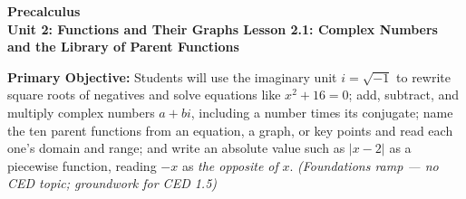\documentclass[10pt]{article}
\newcommand{\CourseName}{Precalculus}
\newcommand{\UnitNumberName}{Unit 2: Functions and Their Graphs \quad}
\newcommand{\LessonNumberName}{Lesson 2.1: Complex Numbers and the Library of Parent Functions}
\begin{document}
\begin{center}
    {\Large\bfseries \CourseName \\
    {\small\bfseries \UnitNumberName \LessonNumberName}}
\end{center}

\begin{tcolorbox}[colback=lilac, colframe=plum, boxrule=0.9pt, arc=2mm,
    left=2mm, right=2mm, top=1.5mm, bottom=1.5mm]
    \textbf{Primary Objective:} Students will use the imaginary unit $i = \sqrt{-1}$ to
    rewrite square roots of negatives and solve equations like $x^2 + 16 = 0$; add, subtract,
    and multiply complex numbers $a + bi$, including a number times its conjugate; name the
    ten parent functions from an equation, a graph, or key points and read each one's domain
    and range; and write an absolute value such as $|x - 2|$ as a piecewise function, reading
    $-x$ as \textit{the opposite of} $x$.
    \hfill\textit{\small (Foundations ramp --- no CED topic; groundwork for CED 1.5)}
\end{tcolorbox}
\end{document}
